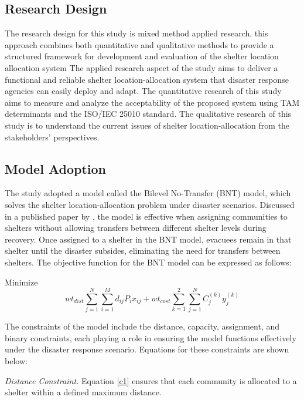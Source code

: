 \documentclass[11pt,letterpaper,]{article}
\begin{document}
	\subsection{Research Design}
	
	The research design for this study is mixed method applied research, this approach combines both quantitative and qualitative methods to provide a structured framework for development and evaluation of the shelter location allocation system
	The applied research aspect of the study aims to deliver a functional and reliable shelter location-allocation system that disaster response agencies can easily deploy and adapt. The quantitative research of this study aims to measure and analyze the acceptability of the proposed system using TAM determinants and the ISO/IEC 25010 standard. The qualitative research of this study is to understand the current issues of shelter location-allocation from the stakeholders’ perspectives.
	
	\subsection{Model Adoption}
	
	The study adopted a model called the Bilevel No-Transfer (BNT) model, which solves the shelter location-allocation problem under disaster scenarios. Discussed in a published paper by \textcite{LeahUP}, the model is effective when assigning communities to shelters without allowing transfers between different shelter levels during recovery. Once assigned to a shelter in the BNT model, evacuees remain in that shelter until the disaster subsides, eliminating the need for transfers between shelters. The objective function for the BNT model can be expressed as follows:
	
	Minimize 
	\begin{equation}
		wt_{dist}\sum_{j=1}^{N}\sum_{i=1}^{M}d_{ij}P_{i}x_{ij}+wt_{cost}\sum_{k=1}^{2}\sum_{j=1}^{N}C_{j}^{(k)}y_{j}^{(k)} 
	\end{equation}
	
	The constraints of the model include the distance, capacity, assignment, and binary constraints, each playing a role in ensuring the model functions effectively under the disaster response scenario. Equations for these constraints are shown below:
	
	\textit{Distance Constraint.} Equation \ref{c1} ensures that each community is allocated to a shelter within a defined maximum distance. 
	
\end{document}
